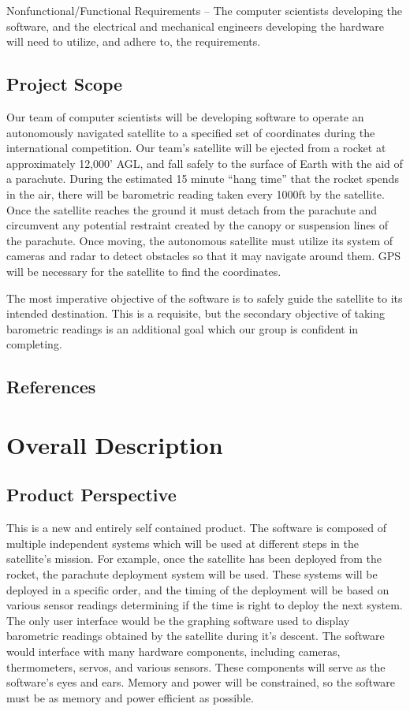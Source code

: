 \documentclass{scrreprt}
\begin{document}
Nonfunctional/Functional Requirements – The computer scientists developing the software, and the electrical and mechanical engineers developing the hardware will need to utilize, and adhere to, the requirements.

\section{Project Scope}
Our team of computer scientists will be developing software to operate an autonomously navigated satellite to a specified set of coordinates during the international competition. Our team’s satellite will be ejected from a rocket at approximately 12,000’ AGL, and fall safely to the surface of Earth with the aid of a parachute. During the estimated 15 minute “hang time” that the rocket spends in the air, there will be barometric reading taken every 1000ft by the satellite. Once the satellite reaches the ground it must detach from the parachute and circumvent any potential restraint created by the canopy or suspension lines of the parachute. Once moving, the autonomous satellite must utilize its system of cameras and radar to detect obstacles so that it may navigate around them. GPS will be necessary for the satellite to find the coordinates.

The most imperative objective of the software is to safely guide the satellite to its intended destination. This is a requisite, but the secondary objective of taking barometric readings is an additional goal which our group is confident in completing.


\section{References}



\chapter{Overall Description}

\section{Product Perspective}
This is a new and entirely self contained product. The software is composed of multiple independent systems which will be used at different steps in the satellite's mission. For example, once the satellite has been deployed from the rocket, the parachute deployment system will be used. These systems will be deployed in a specific order, and the timing of the deployment will be based on various sensor readings determining if the time is right to deploy the next system. The only user interface would be the graphing software used to display barometric readings obtained by the satellite during it's descent. The software would interface with many hardware components, including cameras, thermometers, servos, and various sensors. These components will serve as the software's eyes and ears. Memory and power will be constrained, so the software must be as memory and power efficient as possible.
\end{document}
